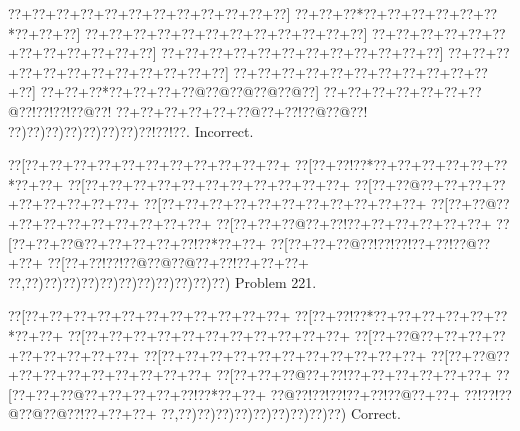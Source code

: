 \documentclass[a5paper]{article}
\begin{document}
\begin{center}
{\goo
\0??+\0??+\0??+\0??+\0??+\0??+\0??+\0??+\0??+\0??+\0??+\0??]
\0??+\0??+\0??*\0??+\0??+\0??+\0??+\0??+\0??*\0??+\0??+\0??]
\0??+\0??+\0??+\0??+\0??+\0??+\0??+\0??+\0??+\0??+\0??+\0??]
\0??+\0??+\0??+\0??+\0??+\0??+\0??+\0??+\0??+\0??+\0??+\0??]
\0??+\0??+\0??+\0??+\0??+\0??+\0??+\0??+\0??+\0??+\0??+\0??]
\0??+\0??+\0??+\0??+\0??+\0??+\0??+\0??+\0??+\0??+\0??+\0??]
\0??+\0??+\0??+\0??+\0??+\0??+\0??+\0??+\0??+\0??+\0??+\0??]
\0??+\0??+\0??*\0??+\0??+\0??+\0??@\0??@\0??@\0??@\0??@\0??]
\0??+\0??+\0??+\0??+\0??+\0??+\0??@\0??!\0??!\0??!\0??@\0??!
\0??+\0??+\0??+\0??+\0??+\0??@\0??+\0??!\0??@\0??@\0??!
\0??)\0??)\0??)\0??)\0??)\0??)\0??)\0??!\0??!\0??.
}
Incorrect. 

\end{center}
\newpage
\begin{center}
{\goo
\0??[\0??+\0??+\0??+\0??+\0??+\0??+\0??+\0??+\0??+\0??+\0??+
\0??[\0??+\0??!\0??*\0??+\0??+\0??+\0??+\0??+\0??*\0??+\0??+
\0??[\0??+\0??+\0??+\0??+\0??+\0??+\0??+\0??+\0??+\0??+\0??+
\0??[\0??+\0??@\0??+\0??+\0??+\0??+\0??+\0??+\0??+\0??+\0??+
\0??[\0??+\0??+\0??+\0??+\0??+\0??+\0??+\0??+\0??+\0??+\0??+
\0??[\0??+\0??@\0??+\0??+\0??+\0??+\0??+\0??+\0??+\0??+\0??+
\0??[\0??+\0??+\0??@\0??+\0??!\0??+\0??+\0??+\0??+\0??+\0??+
\0??[\0??+\0??+\0??@\0??+\0??+\0??+\0??+\0??!\0??*\0??+\0??+
\0??[\0??+\0??+\0??@\0??!\0??!\0??!\0??+\0??!\0??@\0??+\0??+
\0??[\0??+\0??!\0??!\0??@\0??@\0??@\0??+\0??!\0??+\0??+\0??+
\0??,\0??)\0??)\0??)\0??)\0??)\0??)\0??)\0??)\0??)\0??)\0??)
}
Problem 221.

\end{center}
\begin{center}
{\goo
\0??[\0??+\0??+\0??+\0??+\0??+\0??+\0??+\0??+\0??+\0??+\0??+
\0??[\0??+\0??!\0??*\0??+\0??+\0??+\0??+\0??+\0??*\0??+\0??+
\0??[\0??+\0??+\0??+\0??+\0??+\0??+\0??+\0??+\0??+\0??+\0??+
\0??[\0??+\0??@\0??+\0??+\0??+\0??+\0??+\0??+\0??+\0??+\0??+
\0??[\0??+\0??+\0??+\0??+\0??+\0??+\0??+\0??+\0??+\0??+\0??+
\0??[\0??+\0??@\0??+\0??+\0??+\0??+\0??+\0??+\0??+\0??+\0??+
\0??[\0??+\0??+\0??@\0??+\0??!\0??+\0??+\0??+\0??+\0??+\0??+
\0??[\0??+\0??+\0??@\0??+\0??+\0??+\0??+\0??!\0??*\0??+\0??+
\0??@\0??!\0??!\0??!\0??+\0??!\0??@\0??+\0??+
\0??!\0??!\0??@\0??@\0??@\0??!\0??+\0??+\0??+
\0??,\0??)\0??)\0??)\0??)\0??)\0??)\0??)\0??)\0??)
}
Correct. 

\end{center}
\end{document}
